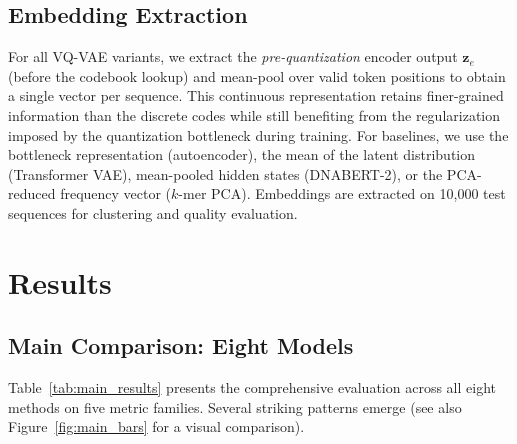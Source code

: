 \documentclass[pmlr]{jmlr}%
\begin{document}
\subsection{Embedding Extraction}

For all VQ-VAE variants, we extract the \emph{pre-quantization} encoder output $\mathbf{z}_e$ (before the codebook lookup) and mean-pool over valid token positions to obtain a single vector per sequence. This continuous representation retains finer-grained information than the discrete codes while still benefiting from the regularization imposed by the quantization bottleneck during training. For baselines, we use the bottleneck representation (autoencoder), the mean of the latent distribution (Transformer VAE), mean-pooled hidden states (DNABERT-2), or the PCA-reduced frequency vector ($k$-mer PCA). Embeddings are extracted on 10,000 test sequences for clustering and quality evaluation.

\section{Results}
\label{sec:results}

\subsection{Main Comparison: Eight Models}

Table~\ref{tab:main_results} presents the comprehensive evaluation across all eight methods on five metric families. Several striking patterns emerge (see also Figure~\ref{fig:main_bars} for a visual comparison).
\end{document}
